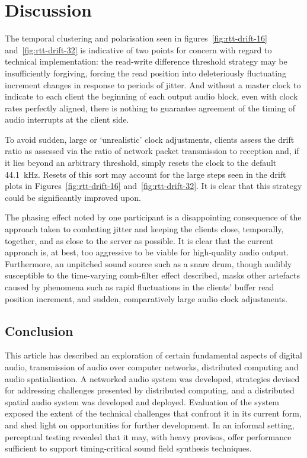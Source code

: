 \section{Discussion}\label{sec:discussion}

The temporal clustering and polarisation seen in figures~\ref{fig:rtt-drift-16}
and~\ref{fig:rtt-drift-32} is indicative of two points for concern with regard
to technical implementation:
the read-write difference threshold strategy may be insufficiently forgiving,
forcing the read position into deleteriously fluctuating increment changes in
response to periods of jitter.
And without a master clock to indicate to each client the beginning of each
output audio block, even with clock rates perfectly aligned, there is nothing
to guarantee agreement of the timing of audio interrupts at the client side.

To avoid sudden, large or `unrealistic' clock adjustments, clients assess
the drift ratio as assessed via the ratio of network packet
transmission to reception and, if it lies beyond an arbitrary threshold,
simply resets the clock to the default \qty{44.1}{\kHz}.
Resets of this sort may account for the large steps seen in the drift plots
in Figures~\ref{fig:rtt-drift-16} and~\ref{fig:rtt-drift-32}.
It is clear that this strategy could be significantly improved upon.

The phasing effect noted by one participant is a disappointing consequence
of the approach taken to combating jitter and keeping the clients close,
temporally, together, and as close to the server as possible.
It is clear that the current approach is, at best, too aggressive to be viable
for high-quality audio output.
Furthermore, an unpitched sound source such as a snare drum, though audibly
susceptible to the time-varying comb-filter effect described, masks other
artefacts caused by phenomena such as rapid fluctuations in the clients' buffer
read position increment, and sudden, comparatively large audio clock
adjustments.

\subsection{Conclusion}\label{subsec:conclusion}

This article has described an exploration of certain fundamental aspects of
digital audio, transmission of audio over computer networks, distributed
computing and audio spatialisation.
A networked audio system was developed, strategies devised for
addressing challenges presented by distributed computing,
and a distributed spatial audio system was developed and deployed.
Evaluation of the system exposed the extent of the technical challenges
that confront it in its current form, and shed light on opportunities for
further development.
In an informal setting, perceptual testing revealed that it may, with heavy
provisos, offer performance sufficient to support timing-critical sound field
synthesis techniques.

